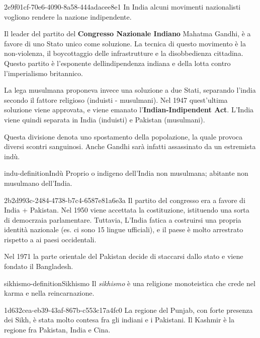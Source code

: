 \documentclass[preview]{standalone}
\begin{document}
\begin{snippet}{2e9f01cf-70e6-4090-8a58-444adacee8e1}
    In India alcuni movimenti nazionalisti vogliono
    rendere la nazione indipendente. 
    
    Il leader del partito del \textbf{Congresso Nazionale Indiano} Mahatma Gandhi,
    è a favore di uno Stato unico come soluzione.
    La tecnica di questo movimento è la non-violenza, il boycottaggio
    delle infrastrutture e la disobbedienza cittadina.
    Questo partito è l'esponente dellindipendenza indiana e della lotta contro l'imperialismo britannico.
    
    La lega musulmana proponeva invece una soluzione a due Stati,
    separando l'india secondo il fattore religioso (induisti - musulmani).
    Nel 1947 quest'ultima soluzione viene approvata, e viene emanato
    l'\textbf{Indian-Indipendent Act}. 
    L'India viene quindi separata in India (induisti) e Pakistan (musulmani).
    
    Questa divisione denota uno spostamento della popolazione,
    la quale provoca diversi scontri sanguinosi.
    Anche Gandhi sarà infatti assassinato da un estremista indù.
\end{snippet}

\begin{snippetdefinition}{indu-definition}{Indù}
    Proprio o indigeno dell'India non musulmana; abitante non musulmano dell'India.
\end{snippetdefinition}

\begin{snippet}{2b2d993c-2484-4738-b7c4-6587e81a6e3a}
    Il partito del congresso era a favore di India + Pakistan. 
    Nel 1950 viene accettata la costituzione, istituendo una sorta di democrzaia parlamentare.
    Tuttavia, L'India fatica a costruirsi una propria identità nazionale (es. ci sono 15 lingue ufficiali),
    e il paese è molto arrestrato rispetto a ai paesi occidentali.

    Nel 1971 la parte orientale del Pakistan decide di staccarsi dallo stato e viene fondato
    il Bangladesh.
\end{snippet}

\begin{snippetdefinition}{sikhismo-definition}{Sikhismo}
    Il \textit{sikhismo} è una religione monoteistica che crede nel karma e nella reincarnazione.
\end{snippetdefinition}

\begin{snippet}{1d632cea-eb39-43af-867b-c553c17a4fc0}
    La regione del Punjab, con forte presenza dei Sikh, è stata molto contesa fra gli
    indiani e i Pakistani.
    Il Kashmir è la regione fra Pakistan, India e Cina.
\end{snippet}
\end{document}
